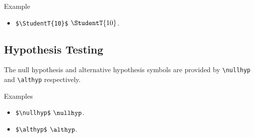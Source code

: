 \begin{myframe}{Example }
    \begin{itemize}
        \item \verb|$\StudentT{10}$| \produces{} $\StudentT{10}$.
    \end{itemize}
\end{myframe}

\subsection{Hypothesis Testing}

The null hypothesis and alternative hypothesis symbols are provided by \verb|\nullhyp| and \verb|\althyp| respectively.

\begin{myframe}{Examples}
    \begin{itemize}
        \item \verb|$\nullhyp$| \produces{} $\nullhyp$.
        \item \verb|$\althyp$| \produces{} $\althyp$.
    \end{itemize}
\end{myframe}